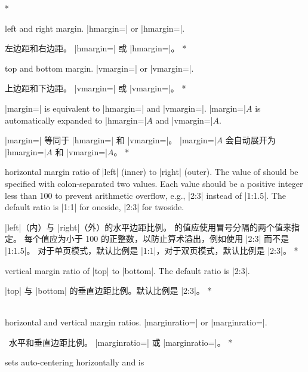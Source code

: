 \begin{Options}
\begin{paracol}{2}
\switchcolumn[0]*\item[hmargin] left and right margin.
  |hmargin=| or |hmargin=|.
\switchcolumn\item[hmargin] 左边距和右边距。
|hmargin=| 或 |hmargin=|。
\switchcolumn[0]*\item[vmargin] top and bottom margin.
  |vmargin=| or |vmargin=|.
\switchcolumn\item[vmargin] 上边距和下边距。
|vmargin=| 或 |vmargin=|。
\switchcolumn[0]*\item[margin] |margin=| is equivalent to 
  |hmargin=| and |vmargin=|.
  |margin=|$A$ is automatically expanded to |hmargin=|$A$ and |vmargin=|$A$.
\switchcolumn\item[margin] |margin=| 等同于
|hmargin=| 和 |vmargin=|。
|margin=|$A$ 会自动展开为 |hmargin=|$A$ 和 |vmargin=|$A$。
\switchcolumn[0]*\item[hmarginratio]
  horizontal margin ratio of |left| (inner) to |right| (outer). 
  The value of  should be specified with colon-separated 
  two values. Each value should be a positive integer less than 100
  to prevent arithmetic overflow, e.g., |2:3| instead of |1:1.5|.
  The default ratio is |1:1| for oneside, |2:3| for twoside.
\switchcolumn\item[hmarginratio]
|left|（内）与 |right|（外）的水平边距比例。
 的值应使用冒号分隔的两个值来指定。
每个值应为小于 100 的正整数，以防止算术溢出，例如使用 |2:3| 而不是 |1:1.5|。
对于单页模式，默认比例是 |1:1|，对于双页模式，默认比例是 |2:3|。
\switchcolumn[0]*\item[vmarginratio]
   vertical margin ratio of |top| to |bottom|. The default ratio is |2:3|.
\switchcolumn\item[vmarginratio]
|top| 与 |bottom| 的垂直边距比例。默认比例是 |2:3|。
\switchcolumn[0]*\item[marginratio\OR ratio]~\\
   horizontal and vertical margin ratios.
  |marginratio=| or
  |marginratio=|.
\switchcolumn\item[marginratio\OR ratio]\
水平和垂直边距比例。
|marginratio=| 或
|marginratio=|。
\switchcolumn[0]*\item[hcentering] sets auto-centering horizontally and is

\end{paracol}
\end{Options}
